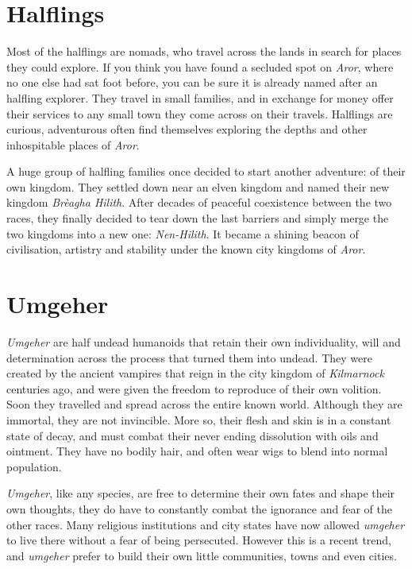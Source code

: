 \section*{Halflings}

Most of the halflings are nomads, who travel across the lands in search for
places they could explore. If you think you have found a secluded spot on
\emph{Aror}, where no one else had sat foot before, you can be sure it is
already named after an halfling explorer. They travel in small families, and
in exchange for money offer their services to any small town they come across
on their travels. Halflings are curious, adventurous often find themselves
exploring the depths and other inhospitable places of \emph{Aror}.

A huge group of halfling families once decided to start another adventure: of
their own kingdom. They settled down near an elven kingdom and named their new
kingdom \emph{Brèagha Hilith}. After decades of peaceful coexistence between
the two races, they finally decided to tear down the last barriers and simply
merge the two kingdoms into a new one: \emph{Nen-Hilith}. It became a shining
beacon of civilisation, artistry and stability under the known city kingdoms
of \emph{Aror}.


\section*{Umgeher}



\emph{Umgeher} are half undead humanoids that retain their own individuality,
will and determination across the process that turned them into undead. They
were created by the ancient vampires that reign in the city kingdom of
\emph{Kilmarnock} centuries ago, and were given the freedom to reproduce of
their own volition. Soon they travelled and spread across the entire known
world. Although they are immortal, they are not invincible. More so, their
flesh and skin is in a constant state of decay, and must combat their never
ending dissolution with oils and ointment. They have no bodily hair, and often
wear wigs to blend into normal population.

\emph{Umgeher}, like any species, are free to determine their own fates and
shape their own thoughts, they do have to constantly combat the ignorance and
fear of the other races. Many religious institutions and city states have now
allowed \emph{umgeher} to live there without a fear of being
persecuted. However this is a recent trend, and \emph{umgeher} prefer to build
their own little communities, towns and even cities.


